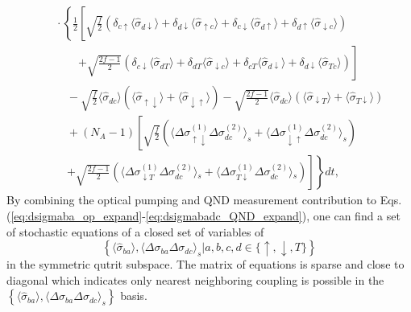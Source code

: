 \documentclass[aps,pra,twocolumn,superscriptaddress]{revtex4-1} %
\newcommand{\nn}{\nonumber}
\newcommand{\expect}[1]{\big\langle #1 \big\rangle}
\begin{document}
\begin{appendix}
\begin{align}
&\quad\!\cdot\!\left\{\! \frac{1}{2}\!\left[\! \sqrt{\!\frac{f}{2}}\!\left(\!\delta_{c\uparrow}\expect{\!\hat{\sigma}_{d\downarrow}\!}\!+\! \delta_{d\downarrow}\expect{\!\hat{\sigma}_{\uparrow c}\!}\!+\!\delta_{c\downarrow}\expect{\!\hat{\sigma}_{d\uparrow}\!} \!+\!\delta_{d\uparrow}\expect{\!\hat{\sigma}_{\downarrow c}\! }\! \right)\right.\right.\nn\\
&\quad\quad\quad\left. +\sqrt{\!\frac{2f\!-\!1}{2}}\!\left(\!\delta_{c\downarrow}\expect{\!\hat{\sigma}_{dT}\!} \!\!+\! \delta_{dT}\expect{\!\hat{\sigma}_{\downarrow c}\! }\!+\!\delta_{cT}\expect{\!\hat{\sigma}_{d\downarrow}\! } \!+\!\delta_{d\downarrow}\expect{\!\hat{\sigma}_{Tc}\! }\! \right)\!\right] \nn\\
&\quad\quad -\sqrt{\!\frac{f}{2}}\expect{\!\hat{\sigma}_{dc}\! }\!\left(\!\expect{\!\hat{\sigma}_{\uparrow\downarrow} \!}\!+\!\expect{\!\hat{\sigma}_{\downarrow\uparrow}\! }\! \right) \!-\!\sqrt{\!\frac{2f-1}{2}}\! \expect{\!\hat{\sigma}_{dc}\!}\!\left(\!\expect{\!\hat{\sigma}_{\downarrow T}\!}\!+\!\expect{\!\hat{\sigma}_{T\downarrow}\!}\! \right)\nn\\
&\quad\quad + \!(N_A\!-\!1)\!\left[\! \sqrt{\!\frac{f}{2}} \left(\expect{\Delta\sigma_{\uparrow\downarrow}^{(1)}\Delta\sigma_{dc}^{(2)}}_s \!+\!\expect{\Delta\sigma_{\downarrow\uparrow}^{(1)}\Delta \sigma_{dc}^{(2)}}_s\right)\right. \nn\\
&\quad\quad\left.\left. + \sqrt{\!\frac{2f\!\!-\!\! 1}{2}}\!\!\left(\!\expect{\!\Delta \sigma\!_{\downarrow T}^{(\!1\!)}\Delta\sigma\!_{dc}^{(\!2\!)}}\!_s \!\!+\!\expect{\!\Delta\sigma\!_{T\downarrow}^{(\! 1\! )} \Delta \sigma\!_{dc}^{(\!2\!)} }\!_s\!\right)\!\right]\!  \right\}\!dt,\label{eq:dsigmabadc_QND_expand}
\end{align}
By combining the optical pumping and QND measurement contribution to Eqs. (\ref{eq:dsigmaba_op_expand}-\ref{eq:dsigmabadc_QND_expand}), one can find a set of stochastic equations of a closed set of variables of 
\begin{equation}
\left\{\expect{\hat{\sigma}_{ba}},\expect{\Delta\sigma_{ba}\Delta\sigma_{dc} }_s\left|a,b,c,d\in \{\uparrow,\downarrow,T \}\right. \right\} 
\end{equation}
in the symmetric qutrit subspace. 
The matrix of equations is sparse and close to diagonal which indicates only nearest neighboring coupling is possible in the $\left\{\expect{\hat{\sigma}_{ba}},\expect{\Delta\sigma_{ba}\Delta\sigma_{dc} }_s\right\}$ basis. 

\end{appendix}
\end{document}
